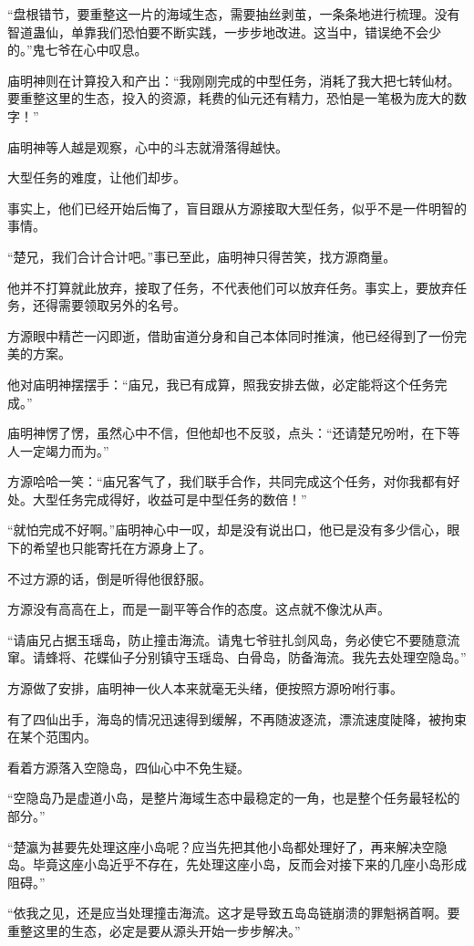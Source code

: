 \begin{this_body}
“盘根错节，要重整这一片的海域生态，需要抽丝剥茧，一条条地进行梳理。没有智道蛊仙，单靠我们恐怕要不断实践，一步步地改进。这当中，错误绝不会少的。”鬼七爷在心中叹息。

庙明神则在计算投入和产出：“我刚刚完成的中型任务，消耗了我大把七转仙材。要重整这里的生态，投入的资源，耗费的仙元还有精力，恐怕是一笔极为庞大的数字！”

庙明神等人越是观察，心中的斗志就滑落得越快。

大型任务的难度，让他们却步。

事实上，他们已经开始后悔了，盲目跟从方源接取大型任务，似乎不是一件明智的事情。

“楚兄，我们合计合计吧。”事已至此，庙明神只得苦笑，找方源商量。

他并不打算就此放弃，接取了任务，不代表他们可以放弃任务。事实上，要放弃任务，还得需要领取另外的名号。

方源眼中精芒一闪即逝，借助宙道分身和自己本体同时推演，他已经得到了一份完美的方案。

他对庙明神摆摆手：“庙兄，我已有成算，照我安排去做，必定能将这个任务完成。”

庙明神愣了愣，虽然心中不信，但他却也不反驳，点头：“还请楚兄吩咐，在下等人一定竭力而为。”

方源哈哈一笑：“庙兄客气了，我们联手合作，共同完成这个任务，对你我都有好处。大型任务完成得好，收益可是中型任务的数倍！”

“就怕完成不好啊。”庙明神心中一叹，却是没有说出口，他已是没有多少信心，眼下的希望也只能寄托在方源身上了。

不过方源的话，倒是听得他很舒服。

方源没有高高在上，而是一副平等合作的态度。这点就不像沈从声。

“请庙兄占据玉瑶岛，防止撞击海流。请鬼七爷驻扎剑风岛，务必使它不要随意流窜。请蜂将、花蝶仙子分别镇守玉瑶岛、白骨岛，防备海流。我先去处理空隐岛。”

方源做了安排，庙明神一伙人本来就毫无头绪，便按照方源吩咐行事。

有了四仙出手，海岛的情况迅速得到缓解，不再随波逐流，漂流速度陡降，被拘束在某个范围内。

看着方源落入空隐岛，四仙心中不免生疑。

“空隐岛乃是虚道小岛，是整片海域生态中最稳定的一角，也是整个任务最轻松的部分。”

“楚瀛为甚要先处理这座小岛呢？应当先把其他小岛都处理好了，再来解决空隐岛。毕竟这座小岛近乎不存在，先处理这座小岛，反而会对接下来的几座小岛形成阻碍。”

“依我之见，还是应当处理撞击海流。这才是导致五岛岛链崩溃的罪魁祸首啊。要重整这里的生态，必定是要从源头开始一步步解决。”


\end{this_body}
